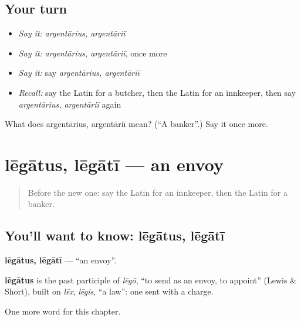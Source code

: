 \subsection*{Your turn}
\begin{itemize}
\raggedright
  \item \emph{Say it:} \emph{argentārius, argentāriī}
  \item \emph{Say it:} \emph{argentārius, argentāriī}, once more
  \item \emph{Say it:} say \emph{argentārius, argentāriī}
  \item \emph{Recall:} say the Latin for a butcher, then the Latin for an innkeeper, then say \emph{argentārius, argentāriī} again
\end{itemize}

\begin{tcolorbox}[breakable,colback=teal!4,colframe=teal!35!black,title={Before you move on}]
What does argentārius, argentāriī mean? (\textquotedblleft{}A banker\textquotedblright{}.) Say it once more.
\end{tcolorbox}
\section[lēgātus, lēgātī]{lēgātus, lēgātī — an envoy}

\label{lesson:LA-C272-legatus}



\begin{quote}
Before the new one: say the Latin for an innkeeper, then the Latin for a banker.
\end{quote}

\subsection*{You'll want to know: lēgātus, lēgātī}
\textbf{lēgātus, lēgātī} — \textquotedblleft{}an envoy\textquotedblright{}.

\begin{cousinweb}
\textbf{lēgātus} is the past participle of \emph{lēgō}, \textquotedblleft{}to send as an envoy, to appoint\textquotedblright{} (Lewis \& Short), built on \emph{lēx}, \emph{lēgis}, \textquotedblleft{}a law\textquotedblright{}: one sent with a charge.
\end{cousinweb}

\begin{grammarlens}[title={What you've built}]
One more word for this chapter.
\end{grammarlens}

